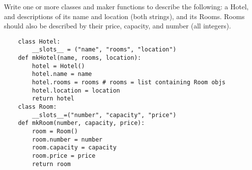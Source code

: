 Write one or more classes and maker functions to describe the following: a Hotel, and descriptions of its name and location (both strings), and its Rooms. Rooms should also be described by their price, capacity, and number (all integers).

	\small
	\begin{answer}
	\begin{lstlisting}
	class Hotel:
		__slots__ = ("name", "rooms", "location")
	def mkHotel(name, rooms, location):
		hotel = Hotel()
		hotel.name = name
		hotel.rooms = rooms # rooms = list containing Room objs
		hotel.location = location
		return hotel
	class Room:
		__slots__=("number", "capacity", "price")
	def mkRoom(number, capacity, price):
		room = Room()
		room.number = number
		room.capacity = capacity
		room.price = price
		return room
	\end{lstlisting}
	\end{answer}
	\normalsize
	
	
	
	
	\vspace{48pt}